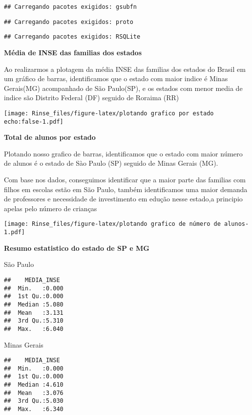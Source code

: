 \documentclass[
]{article}
\begin{document}
\begin{verbatim}
## Carregando pacotes exigidos: gsubfn
\end{verbatim}

\begin{verbatim}
## Carregando pacotes exigidos: proto
\end{verbatim}

\begin{verbatim}
## Carregando pacotes exigidos: RSQLite
\end{verbatim}

\textbf{Média de INSE das familias dos estados}

Ao realizarmos a plotagem da média INSE das familias dos estados do
Brasil em um gráfico de barras, identificamos que o estado com maior
indice é Minas Gerais(MG) acompanhado de São Paulo(SP), e os estados com
menor media de indice são Distrito Federal (DF) seguido de Roraima (RR)

\texttt{[image: Rinse\_files/figure-latex/plotando grafico por estado echo:false-1.pdf]}

\textbf{Total de alunos por estado}

Plotando nosso grafico de barras, identificamos que o estado com maior
número de alunos é o estado de Sào Paulo (SP) seguido de Minas Gerais
(MG).

Com base nos dados, conseguimos identificar que a maior parte das
familias com filhos em escolas estão em São Paulo, também identificamos
uma maior demanda de professores e necessidade de investimento em edução
nesse estado,a principio apelas pelo número de crianças

\texttt{[image: Rinse\_files/figure-latex/plotando grafico de número de alunos-1.pdf]}

\textbf{Resumo estatistico do estado de SP e MG}

São Paulo

\begin{verbatim}
##    MEDIA_INSE   
##  Min.   :0.000  
##  1st Qu.:0.000  
##  Median :5.080  
##  Mean   :3.131  
##  3rd Qu.:5.310  
##  Max.   :6.040
\end{verbatim}

Minas Gerais

\begin{verbatim}
##    MEDIA_INSE   
##  Min.   :0.000  
##  1st Qu.:0.000  
##  Median :4.610  
##  Mean   :3.076  
##  3rd Qu.:5.030  
##  Max.   :6.340
\end{verbatim}
\end{document}

